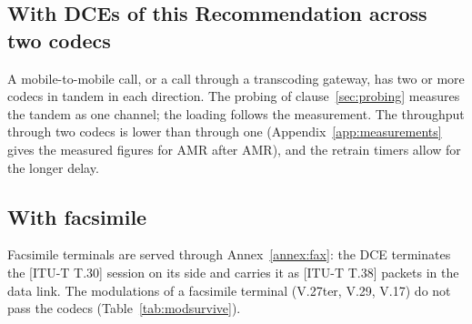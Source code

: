 \documentclass[a4paper,11pt]{article}
\newcounter{annex}
\newcommand{\rec}[1]{[ITU-T #1]}
\begin{document}
\subsection{With DCEs of this Recommendation across two codecs}
A mobile-to-mobile call, or a call through a transcoding gateway, has two
or more codecs in tandem in each direction.  The probing of
clause~\ref{sec:probing} measures the tandem as one channel; the loading
follows the measurement.  The throughput through two codecs is lower than
through one (Appendix~\ref{app:measurements} gives the measured figures
for AMR after AMR), and the retrain timers allow for the longer delay.

\subsection{With facsimile}
Facsimile terminals are served through Annex~\ref{annex:fax}: the DCE
terminates the \rec{T.30} session on its side and carries it as \rec{T.38}
packets in the data link.  The modulations of a facsimile terminal
(V.27ter, V.29, V.17) do not pass the codecs (Table~\ref{tab:modsurvive}).

\end{document}
